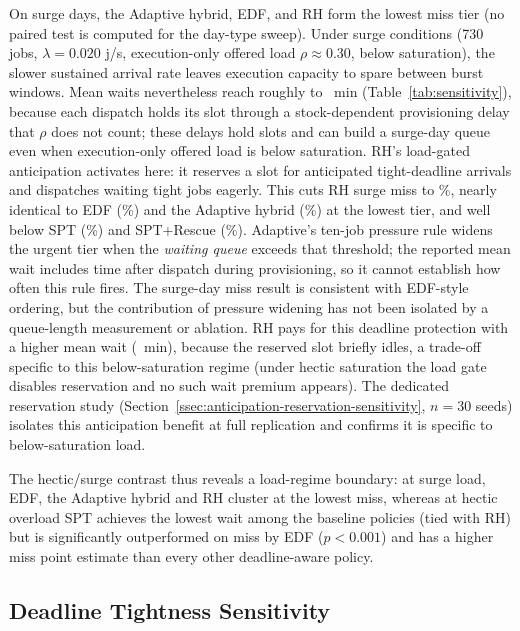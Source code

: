 {On surge days, the Adaptive hybrid, EDF, and RH form the lowest miss tier (no paired test is computed for the day-type sweep). Under surge conditions (730 jobs, $\lambda=0.020$ j/s, execution-only offered load $\rho\approx0.30$, below saturation), the slower sustained arrival rate leaves execution capacity to spare between burst windows. Mean waits nevertheless reach roughly \SensSrgDayWaitLo{} to \SensSrgDayWaitHi{}~min (Table~\ref{tab:sensitivity}), because each dispatch holds its slot through a stock-dependent provisioning delay that $\rho$ does not count; these delays hold slots and can build a surge-day queue even when execution-only offered load is below saturation. RH's load-gated anticipation activates here: it reserves a slot for anticipated tight-deadline arrivals and dispatches waiting tight jobs eagerly. This cuts RH surge miss to \SensSrgRHmiss\%, nearly identical to EDF (\SensSrgEDFmiss\%) and the Adaptive hybrid (\SensSrgAdaptiveMiss\%) at the lowest tier, and well below SPT (\SensSrgSPTmiss\%) and SPT+Rescue (\SensSrgRescueMiss\%). Adaptive's ten-job pressure rule widens the urgent tier when the \emph{waiting queue} exceeds that threshold; the reported mean wait includes time after dispatch during provisioning, so it cannot establish how often this rule fires. The surge-day miss result is consistent with EDF-style ordering, but the contribution of pressure widening has not been isolated by a queue-length measurement or ablation. RH pays for this deadline protection with a higher mean wait (\SensSrgRHwait~min), because the reserved slot briefly idles, a trade-off specific to this below-saturation regime (under hectic saturation the load gate disables reservation and no such wait premium appears). The dedicated reservation study (Section~\ref{ssec:anticipation-reservation-sensitivity}, $n=30$ seeds) isolates this anticipation benefit at full replication and confirms it is specific to below-saturation load.

The hectic/surge contrast thus reveals a load-regime boundary: at surge load, EDF, the Adaptive hybrid and RH cluster at the lowest miss, whereas at hectic overload SPT achieves the lowest wait among the baseline policies (tied with RH) but is significantly outperformed on miss by EDF ($p<0.001$) and has a higher miss point estimate than every other deadline-aware policy.

\subsection{Deadline Tightness Sensitivity}
\label{ssec:deadline-tightness-sensitivity}

}
